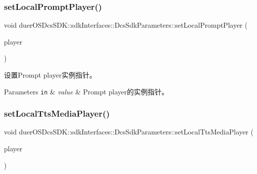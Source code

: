 \subsubsection{\texorpdfstring{set\+Local\+Prompt\+Player()}{setLocalPromptPlayer()}}
{\footnotesize\ttfamily void duer\+O\+S\+Dcs\+S\+D\+K\+::sdk\+Interfaces\+::\+Dcs\+Sdk\+Parameters\+::set\+Local\+Prompt\+Player (\begin{DoxyParamCaption}\item[{std\+::shared\+\_\+ptr$<$ \hyperlink{classduerOSDcsSDK_1_1sdkInterfaces_1_1MediaPlayerInterface}{Media\+Player\+Interface} $>$}]{player }\end{DoxyParamCaption})\hspace{0.3cm}{\ttfamily [inline]}}



设置\+Prompt player实例指针。 


\begin{DoxyParams}[1]{Parameters}
\mbox{\tt in}  & {\em value} & Prompt player的实例指针。 \\
\hline
\end{DoxyParams}
\mbox{\label{structduerOSDcsSDK_1_1sdkInterfaces_1_1DcsSdkParameters_a77608e2433a08f05eb6f4ab86ff44950}} 
\subsubsection{\texorpdfstring{set\+Local\+Tts\+Media\+Player()}{setLocalTtsMediaPlayer()}}
{\footnotesize\ttfamily void duer\+O\+S\+Dcs\+S\+D\+K\+::sdk\+Interfaces\+::\+Dcs\+Sdk\+Parameters\+::set\+Local\+Tts\+Media\+Player (\begin{DoxyParamCaption}\item[{std\+::shared\+\_\+ptr$<$ \hyperlink{classduerOSDcsSDK_1_1sdkInterfaces_1_1MediaPlayerInterface}{Media\+Player\+Interface} $>$}]{player }\end{DoxyParamCaption})\hspace{0.3cm}{\ttfamily [inline]}}



